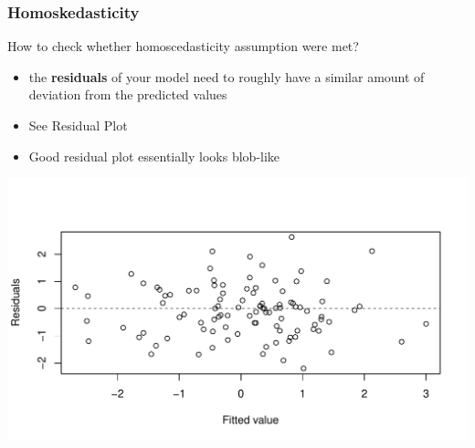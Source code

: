 \documentclass[10p]{beamer}\usepackage[]{graphicx}\usepackage[]{color}
\makeatletter
\def\maxwidth{ %
  \ifdim\Gin@nat@width>\linewidth
    \linewidth
  \else
    \Gin@nat@width
  \fi
}
\newenvironment{knitrout}{}{} %
\makeatother
\begin{document}
\begin{frame}
\frametitle{Homoskedasticity}
How to check whether homoscedasticity assumption were met?
\begin{itemize}
\item the \textbf{residuals} of your model need to roughly have a similar amount of deviation from the predicted values
\item See Residual Plot
\item Good residual plot essentially looks blob-like
\end{itemize}
\begin{knitrout}
\color{fgcolor}
\includegraphics[width=\maxwidth]{figure/unnamed-chunk-27-1} 

\end{knitrout}

\end{frame}
\end{document}
